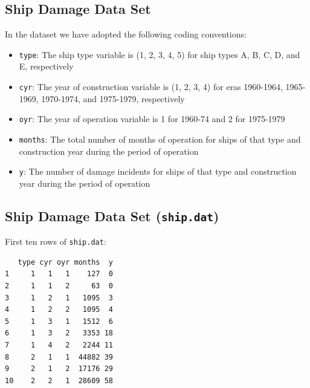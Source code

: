\documentclass{article}\usepackage[]{graphicx}\usepackage[svgnames]{xcolor}
\makeatletter
\newenvironment{kframe}{%
 \def\at@end@of@kframe{}%
 \ifinner\ifhmode%
  \def\at@end@of@kframe{\end{minipage}}%
  \begin{minipage}{\columnwidth}%
 \fi\fi%
 \def\FrameCommand##1{\hskip\@totalleftmargin \hskip-\fboxsep
 \colorbox{shadecolor}{##1}\hskip-\fboxsep
     \hskip-\linewidth \hskip-\@totalleftmargin \hskip\columnwidth}%
 \MakeFramed {\advance\hsize-\width
   \@totalleftmargin\z@ \linewidth\hsize
   \@setminipage}}%
 {\par\unskip\endMakeFramed%
 \at@end@of@kframe}
\newenvironment{knitrout}{}{} %
\makeatother
\begin{document}
\subsection*{Ship Damage Data Set}
In the dataset we have adopted the following coding conventions:
\begin{itemize}
    \item \texttt{type}: The ship type variable is (1, 2, 3, 4, 5) for ship types A, B, C, D, and E,
          respectively
    \item \texttt{cyr}: The year of construction variable is (1, 2, 3, 4) for eras 1960-1964,
          1965-1969, 1970-1974, and 1975-1979, respectively
    \item \texttt{oyr}: The year of operation variable is 1 for 1960-74 and 2 for 1975-1979
    \item \texttt{months}: The total number of months of operation for ships of that type and
          construction year during the period of operation
    \item \texttt{y}: The number of damage incidents for ships of that type and construction
          year during the period of operation
\end{itemize}
\subsection*{Ship Damage Data Set (\texttt{ship.dat})}
\begin{Example}{}
    First ten rows of \texttt{ship.dat}:
\begin{knitrout}
\color{fgcolor}\begin{kframe}
\begin{verbatim}
   type cyr oyr months  y
1     1   1   1    127  0
2     1   1   2     63  0
3     1   2   1   1095  3
4     1   2   2   1095  4
5     1   3   1   1512  6
6     1   3   2   3353 18
7     1   4   2   2244 11
8     2   1   1  44882 39
9     2   1   2  17176 29
10    2   2   1  28609 58
\end{verbatim}
\end{kframe}
\end{knitrout}
\end{Example}
\end{document}
